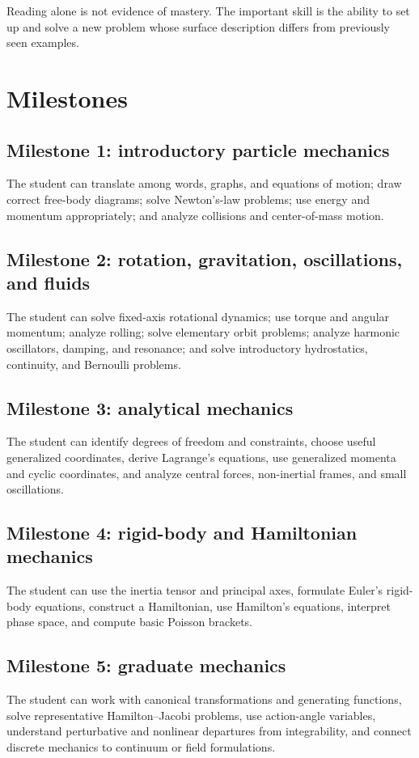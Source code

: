 Reading alone is not evidence of mastery.  The important skill is the ability to set up and solve a
new problem whose surface description differs from previously seen examples.

\section{Milestones}

\subsection*{Milestone 1: introductory particle mechanics}
The student can translate among words, graphs, and equations of motion; draw correct free-body
diagrams; solve Newton's-law problems; use energy and momentum appropriately; and analyze collisions
and center-of-mass motion.

\subsection*{Milestone 2: rotation, gravitation, oscillations, and fluids}
The student can solve fixed-axis rotational dynamics; use torque and angular momentum; analyze
rolling; solve elementary orbit problems; analyze harmonic oscillators, damping, and resonance; and
solve introductory hydrostatics, continuity, and Bernoulli problems.

\subsection*{Milestone 3: analytical mechanics}
The student can identify degrees of freedom and constraints, choose useful generalized coordinates,
derive Lagrange's equations, use generalized momenta and cyclic coordinates, and analyze central
forces, non-inertial frames, and small oscillations.

\subsection*{Milestone 4: rigid-body and Hamiltonian mechanics}
The student can use the inertia tensor and principal axes, formulate Euler's rigid-body equations,
construct a Hamiltonian, use Hamilton's equations, interpret phase space, and compute basic Poisson
brackets.

\subsection*{Milestone 5: graduate mechanics}
The student can work with canonical transformations and generating functions, solve representative
Hamilton--Jacobi problems, use action-angle variables, understand perturbative and nonlinear
departures from integrability, and connect discrete mechanics to continuum or field formulations.

